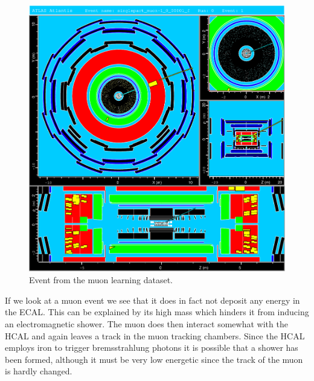 \documentclass[11pt,a4paper,notitlepage]{scrartcl}
\begin{document}
\begin{figure}[H]
	\centering
	\includegraphics[width=.8\linewidth]{atlantis/muon_testing}
	\caption{Event from the muon learning dataset.}
\end{figure} 
If we look at a muon event we see that it does in fact not deposit any energy in the ECAL. This can be explained by its high mass which hinders it from inducing an electromagnetic shower. The muon does then interact somewhat with the HCAL and again leaves a track in the muon tracking chambers. Since the HCAL employs iron to trigger bremsstrahlung photons it is possible that a shower has been formed, although it must be very low energetic since the track of the muon is hardly changed. 
\end{document}
